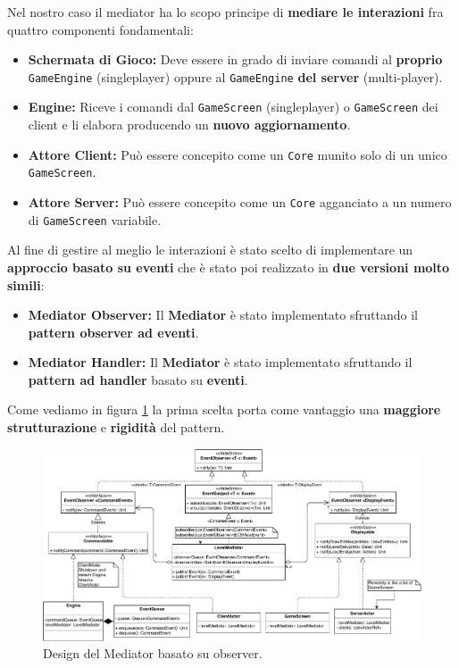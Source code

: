 Nel nostro caso il mediator ha lo scopo principe di \textbf{mediare le interazioni} fra quattro componenti fondamentali:
\begin{itemize}
	\item{\textbf{Schermata di Gioco:}}
	Deve essere in grado di inviare comandi al \textbf{proprio}  \texttt{GameEngine} (singleplayer) oppure al \texttt{GameEngine} \textbf{del server} (multi-player). 
	\item{\textbf{Engine:}}
	Riceve i comandi dal \texttt{GameScreen} (singleplayer) o \texttt{GameScreen} dei client e li elabora producendo un \textbf{nuovo aggiornamento}. 
	\item{\textbf{Attore Client:}}
	Può essere concepito come un \texttt{Core} munito solo di un unico \texttt{GameScreen}.
	\item{\textbf{Attore Server:}}
	Può essere concepito come un \texttt{Core} agganciato a un numero di \texttt{GameScreen} variabile.
\end{itemize}
Al fine di gestire al meglio le interazioni è stato scelto di implementare un \textbf{approccio basato su eventi} che è stato poi realizzato in \textbf{due versioni molto simili}:
\begin{itemize}
	\item{\textbf{Mediator Observer:}}
	Il \textbf{Mediator} è stato implementato sfruttando il \textbf{pattern observer ad eventi}.
	\item{\textbf{Mediator Handler:}}
	Il \textbf{Mediator} è stato implementato sfruttando il \textbf{pattern ad handler} basato su \textbf{eventi}.
\end{itemize}

Come vediamo in figura \ref{fig:mediatorObserver} la prima scelta porta come vantaggio una \textbf{maggiore strutturazione} e \textbf{rigidità} del pattern.

\begin{figure}[H]
	\centering
	\includegraphics[width=0.99\columnwidth]{drawio/mediator/mediatorObserver.pdf}
	\caption{Design del Mediator basato su observer.}
	\label{fig:mediatorObserver}
\end{figure}

